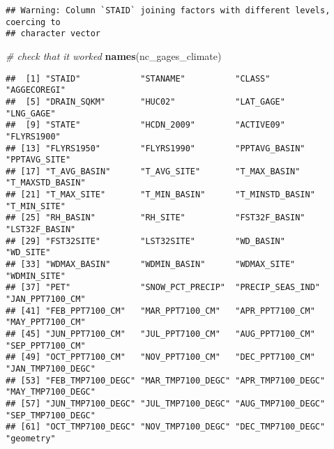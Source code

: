 \documentclass[]{article}
\newenvironment{Shaded}{\begin{snugshade}}{\end{snugshade}}
\newcommand{\KeywordTok}[1]{\textcolor[rgb]{0.13,0.29,0.53}{\textbf{#1}}}
\newcommand{\DataTypeTok}[1]{\textcolor[rgb]{0.13,0.29,0.53}{#1}}
\newcommand{\StringTok}[1]{\textcolor[rgb]{0.31,0.60,0.02}{#1}}
\newcommand{\CommentTok}[1]{\textcolor[rgb]{0.56,0.35,0.01}{\textit{#1}}}
\newcommand{\OperatorTok}[1]{\textcolor[rgb]{0.81,0.36,0.00}{\textbf{#1}}}
\newcommand{\NormalTok}[1]{#1}
\begin{document}
\begin{Shaded}
\end{Shaded}

\begin{verbatim}
## Warning: Column `STAID` joining factors with different levels, coercing to
## character vector
\end{verbatim}

\begin{Shaded}
\begin{Highlighting}[]
\CommentTok{# check that it worked}
\KeywordTok{names}\NormalTok{(nc_gages_climate)}
\end{Highlighting}
\end{Shaded}

\begin{verbatim}
##  [1] "STAID"            "STANAME"          "CLASS"            "AGGECOREGI"      
##  [5] "DRAIN_SQKM"       "HUC02"            "LAT_GAGE"         "LNG_GAGE"        
##  [9] "STATE"            "HCDN_2009"        "ACTIVE09"         "FLYRS1900"       
## [13] "FLYRS1950"        "FLYRS1990"        "PPTAVG_BASIN"     "PPTAVG_SITE"     
## [17] "T_AVG_BASIN"      "T_AVG_SITE"       "T_MAX_BASIN"      "T_MAXSTD_BASIN"  
## [21] "T_MAX_SITE"       "T_MIN_BASIN"      "T_MINSTD_BASIN"   "T_MIN_SITE"      
## [25] "RH_BASIN"         "RH_SITE"          "FST32F_BASIN"     "LST32F_BASIN"    
## [29] "FST32SITE"        "LST32SITE"        "WD_BASIN"         "WD_SITE"         
## [33] "WDMAX_BASIN"      "WDMIN_BASIN"      "WDMAX_SITE"       "WDMIN_SITE"      
## [37] "PET"              "SNOW_PCT_PRECIP"  "PRECIP_SEAS_IND"  "JAN_PPT7100_CM"  
## [41] "FEB_PPT7100_CM"   "MAR_PPT7100_CM"   "APR_PPT7100_CM"   "MAY_PPT7100_CM"  
## [45] "JUN_PPT7100_CM"   "JUL_PPT7100_CM"   "AUG_PPT7100_CM"   "SEP_PPT7100_CM"  
## [49] "OCT_PPT7100_CM"   "NOV_PPT7100_CM"   "DEC_PPT7100_CM"   "JAN_TMP7100_DEGC"
## [53] "FEB_TMP7100_DEGC" "MAR_TMP7100_DEGC" "APR_TMP7100_DEGC" "MAY_TMP7100_DEGC"
## [57] "JUN_TMP7100_DEGC" "JUL_TMP7100_DEGC" "AUG_TMP7100_DEGC" "SEP_TMP7100_DEGC"
## [61] "OCT_TMP7100_DEGC" "NOV_TMP7100_DEGC" "DEC_TMP7100_DEGC" "geometry"
\end{verbatim}
\end{document}
